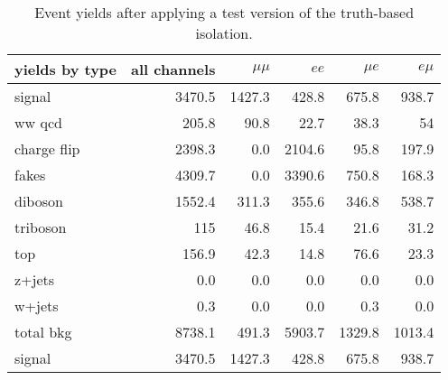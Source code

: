 \begin{table}[htp]
  \centering
  \begin{tabular}{l|rrrrr}
    yields by type&all channels&$\mu\mu$&$ee$&$\mu e$&$e\mu$\\
    \hline\hline
    signal&3470.5&1427.3&428.8&675.8&938.7\\
    ww qcd&205.8&90.8&22.7&38.3&54\\
    charge flip&2398.3&0.0&2104.6&95.8&197.9\\
    fakes&4309.7&0.0&3390.6&750.8&168.3\\
    diboson&1552.4&311.3&355.6&346.8&538.7\\
    triboson&115&46.8&15.4&21.6&31.2\\
    top&156.9&42.3&14.8&76.6&23.3\\
    z+jets&0.0&0.0&0.0&0.0&0.0\\
    w+jets&0.3&0.0&0.0&0.3&0.0\\
    \hline
    total bkg&8738.1&491.3&5903.7&1329.8&1013.4\\
    signal&3470.5&1427.3&428.8&675.8&938.7\\
    \hline
  \end{tabular}
  \caption{Event yields after applying a test version of the truth-based isolation.}
  \label{tab:truth_iso_tightiso}
\end{table}
